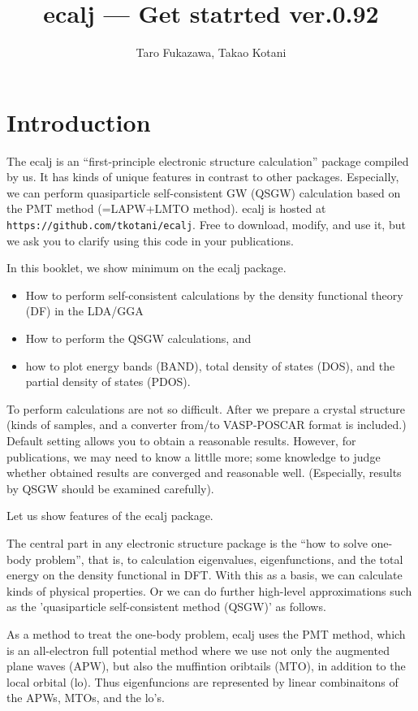 \documentclass[a4paper,10pt,epsf,fleqn]{article}
\author{Taro Fukazawa, Takao Kotani}
\title{ecalj --- Get statrted ver.0.92}
\begin{document}
\maketitle
\tableofcontents
\newpage
\section{Introduction}
The ecalj is an ``first-principle electronic structure calculation''
package compiled by us. It has kinds of unique features in contrast to other packages.
Especially, we can perform quasiparticle self-consistent GW (QSGW)
calculation based on the PMT method (=LAPW+LMTO method).
ecalj is hosted at \verb+https://github.com/tkotani/ecalj+.
Free to download, modify, and use it, but we ask you to clarify 
using this code in your publications.

In this booklet, we show minimum on the ecalj package.
\begin{itemize}
\item
How to perform self-consistent calculations by the density functional
theory (DF) in the LDA/GGA 
\item
How to perform the QSGW calculations, and\\ 
\item
how to plot energy bands (BAND), total density of states
(DOS), and the partial density of states (PDOS).
\end{itemize}

To perform calculations are not so difficult.
After we prepare a crystal structure 
(kinds of samples, and a converter from/to VASP-POSCAR format is included.)
Default setting allows you to obtain a reasonable results.
However, for publications, we may need to know a littlle more;
some knowledge to judge whether obtained results 
are converged and reasonable well. 
(Especially, results by QSGW should be examined carefully). 

Let us show features of the ecalj package.

The central part in any electronic structure package is the
``how to solve one-body problem'', that is,
to calculation eigenvalues, eigenfunctions, and the total energy
on the density functional in DFT.
With this as a basis, we can calculate kinds of physical properties.
Or we can do further high-level approximations
such as the 'quasiparticle self-consistent method (QSGW)' as follows.

As a method to treat the one-body problem, ecalj uses the PMT method, which is an
all-electron full potential method where we use not only the
augmented plane waves (APW), but also the muffintion oribtails (MTO),
in addition to the local orbital (lo).
Thus eigenfuncions are represented by linear combinaitons of the
APWs, MTOs, and the lo's.
\end{document}

